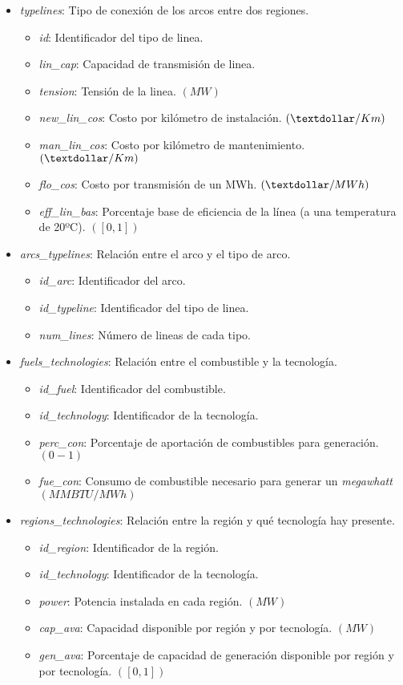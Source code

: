 \begin{itemize}
	\item \textit{typelines}: Tipo de conexión de los arcos entre dos regiones.
	\begin{itemize}
		\item \textit{id}: Identificador del tipo de linea.		
		\item \textit{lin\_cap}: Capacidad de transmisión de linea.
		\item \textit{tension}: Tensión de la linea. $ (MW) $
		\item \textit{new\_lin\_cos}: Costo por kilómetro de instalación. $ (\textdollar/Km) $
		\item \textit{man\_lin\_cos}: Costo por kilómetro de mantenimiento. $ (\textdollar/Km) $
		\item \textit{flo\_cos}: Costo por transmisión de un MWh. $ (\textdollar/MWh) $
		\item \textit{eff\_lin\_bas}: Porcentaje base de eficiencia de la línea (a una temperatura de 20ºC). $ ([0,1]) $
	\end{itemize}

	\item \textit{arcs\_typelines}: Relación entre el arco y el tipo de arco.
	\begin{itemize}
		\item \textit{id\_arc}: Identificador del arco.
		\item \textit{id\_typeline}: Identificador del tipo de linea.
		\item \textit{num\_lines}: Número de lineas de cada tipo.
	\end{itemize}
	
	\item \textit{fuels\_technologies}: Relación entre el combustible y la tecnología.
	\begin{itemize}
		\item \textit{id\_fuel}: Identificador del combustible.
		\item \textit{id\_technology}: Identificador de la tecnología.
		\item \textit{perc\_con}: Porcentaje de aportación de combustibles para generación. $ (0 - 1) $
		\item \textit{fue\_con}: Consumo de combustible necesario para generar un \textit{megawhatt} $ (MMBTU/MWh) $
	\end{itemize}

	\item \textit{regions\_technologies}: Relación entre la región y qué tecnología hay presente.
	\begin{itemize}
		\item \textit{id\_region}: Identificador de la región.
		\item \textit{id\_technology}: Identificador de la tecnología.
		\item \textit{power}: Potencia instalada en cada región. $ (MW) $
		\item \textit{cap\_ava}: Capacidad disponible por región y por tecnología. $ (MW) $
		\item \textit{gen\_ava}: Porcentaje de capacidad de generación disponible por región y por tecnología. $ ([0,1]) $
	\end{itemize}
	

\end{itemize}
